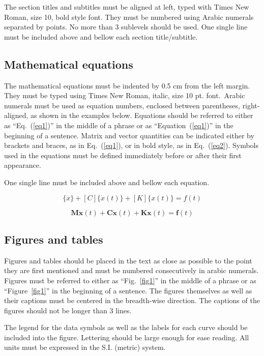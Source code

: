 \documentclass[10pt,fleqn,a4paper,twoside]{article}
\begin{document}
The section titles and subtitles must be aligned at left, typed with Times New Roman, size 10, bold style font. They must be numbered using Arabic numerals separated by points. No more than 3 sublevels should be used. One single line must be included above and bellow each section title/subtitle.

\subsection{Mathematical equations}

The mathematical equations must be indented by 0.5 cm from the left margin. They must be typed using Times New Roman, italic, size 10 pt. font.\ Arabic numerals must be used as equation numbers, enclosed between parentheses, right-aligned, as shown in the examples below. Equations should be referred to either as ``Eq.~(\ref{eq1})'' in the middle of a phrase or as ``Equation~(\ref{eq1})'' in the beginning of a sentence. Matrix and vector quantities can be indicated either by brackets and braces, as in Eq.~(\ref{eq1}), or in bold style, as in Eq.~(\ref{eq2}). Symbols used in the equations must be defined immediately before or after their first appearance.

One single line must be included above and bellow each equation.

\begin{equation}
[M]\{\ddot{x}\}+[C]\{\dot{x}(t)\}+[K]\{x(t)\}={f(t)} 
\label{eq1}
\end{equation}

\begin{equation}
\mathbf{M\ddot{x}}(t)+\mathbf{C\dot{x}}(t)+\mathbf{Kx}(t)=\mathbf{f}(t) 
\label{eq2}
\end{equation}

\subsection{Figures and tables}

Figures and tables should be placed in the text as close as possible to the point they are first mentioned and must be numbered consecutively in arabic numerals. Figures must be referred to either as ``Fig.~\ref{fig1}'' in the middle of a phrase or as ``Figure~\ref{fig1}'' in the beginning of a sentence. The figures themselves as well as their captions must be centered in the breadth-wise direction. The captions of the figures should not be longer than 3 lines.

The legend for the data symbols as well as the labels for each curve should be included into the figure. Lettering should be large enough for ease reading. All units must be expressed in the S.I. (metric) system.
\end{document}
